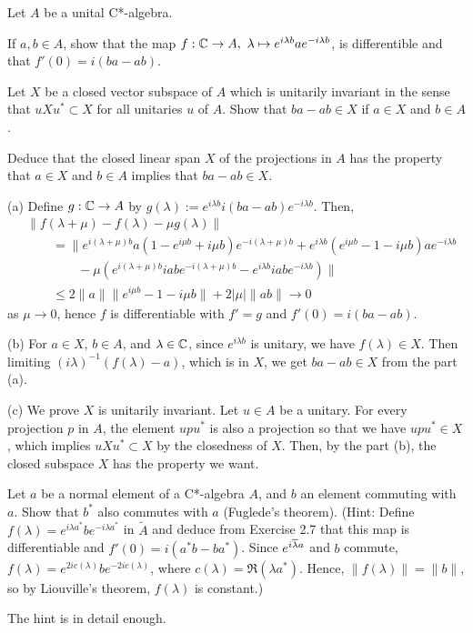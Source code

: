 \documentclass{../solution}
\begin{document}
\begin{prb}
Let $A$ be a unital C*-algebra.
\begin{parts}
\item
If $a,b\in A$, show that the map $f:\mathbb{C}\to A,\ \lambda\mapsto e^{i\lambda b}ae^{-i\lambda b}$, is differentible and that $f'(0)=i(ba-ab)$.
\item
Let $X$ be a closed vector subspace of $A$ which is unitarily invariant in the sense that $uXu^*\subset X$ for all unitaries $u$ of $A$.
Show that $ba-ab\in X$ if $a\in X$ and $b\in A$.
\item
Deduce that the closed linear span $X$ of the projections in $A$ has the property that $a\in X$ and $b\in A$ implies that $ba-ab\in X$.
\end{parts}
\end{prb}
\begin{sol}
(a)
Define $g:\mathbb{C}\to A$ by $g(\lambda):=e^{i\lambda b}i(ba-ab)e^{-i\lambda b}$.
Then,
\begin{align*}
&\|f(\lambda+\mu)-f(\lambda)-\mu g(\lambda)\|\\
&\qquad=\|e^{i(\lambda+\mu)b}a(1-e^{i\mu b}+i\mu b)e^{-i(\lambda+\mu)b}
+e^{i\lambda b}(e^{i\mu b}-1-i\mu b)ae^{-i\lambda b}\\
&\qquad\qquad-\mu(e^{i(\lambda+\mu)b}iabe^{-i(\lambda+\mu)b}-e^{i\lambda b}iabe^{-i\lambda b})\|\\
&\qquad\le2\|a\|\|e^{i\mu b}-1-i\mu b\|+2|\mu|\|ab\|\to0
\end{align*}
as $\mu\to0$, hence $f$ is differentiable with $f'=g$ and $f'(0)=i(ba-ab)$.

(b)
For $a\in X$, $b\in A$, and $\lambda\in\mathbb{C}$, since $e^{i\lambda b}$ is unitary, we have $f(\lambda)\in X$.
Then limiting $(i\lambda)^{-1}(f(\lambda)-a)$, which is in $X$, we get $ba-ab\in X$ from the part (a).

(c)
We prove $X$ is unitarily invariant.
Let $u\in A$ be a unitary.
For every projection $p$ in $A$, the element $upu^*$ is also a projection so that we have $upu^*\in X$, which implies $uXu^*\subset X$ by the closedness of $X$.
Then, by the part (b), the closed subspace $X$ has the property we want.
\end{sol}


\begin{prb}
Let $a$ be a normal element of a C*-algebra $A$, and $b$ an element commuting with $a$. Show that $b^*$ also commutes with $a$ (Fuglede's theorem).
(Hint: Define $f(\lambda)=e^{i\lambda a^*}be^{- i\lambda a^*}$ in $\tilde A$ and deduce from Exercise 2.7 that this map is differentiable and $f'(0)=i(a^*b-ba^*)$.
Since $e^{i\overline\lambda a}$ and $b$ commute, $f(\lambda)=e^{2ic(\lambda)}be^{-2ic(\lambda)}$, where $c(\lambda)=\Re(\lambda a^*)$.
Hence, $\|f(\lambda)\|=\|b\|$, so by Liouville's theorem, $f(\lambda)$ is constant.)
\end{prb}
\begin{sol}
The hint is in detail enough.
\end{sol}
\end{document}
